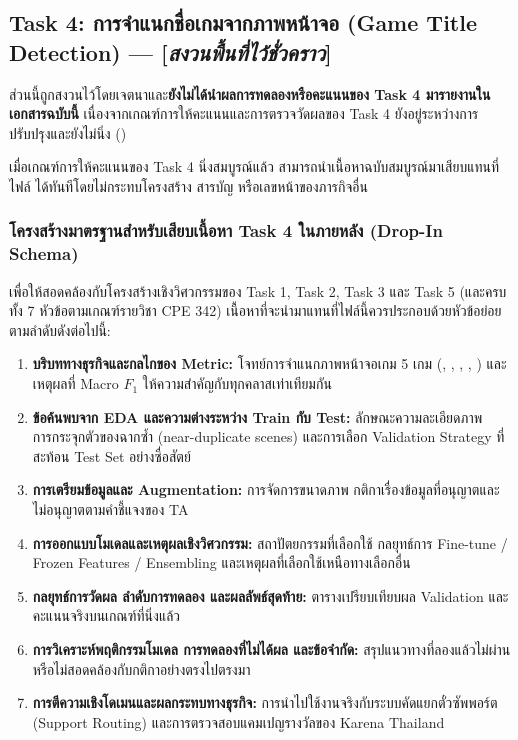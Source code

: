 \clearpage
\subsection{Task 4: การจำแนกชื่อเกมจากภาพหน้าจอ (Game Title Detection) — [\textit{สงวนพื้นที่ไว้ชั่วคราว}]}
\label{subsec:task4}

\begin{warningbox}
ส่วนนี้ถูกสงวนไว้โดยเจตนาและ\textbf{ยังไม่ได้นำผลการทดลองหรือคะแนนของ Task 4 มารายงานในเอกสารฉบับนี้} เนื่องจากเกณฑ์การให้คะแนนและการตรวจวัดผลของ Task 4 ยังอยู่ระหว่างการปรับปรุงและยังไม่นิ่ง (\TFourStatus)

เมื่อเกณฑ์การให้คะแนนของ Task 4 นิ่งสมบูรณ์แล้ว สามารถนำเนื้อหาฉบับสมบูรณ์มาเสียบแทนที่ไฟล์  ได้ทันทีโดยไม่กระทบโครงสร้าง สารบัญ หรือเลขหน้าของภารกิจอื่น
\end{warningbox}

\subsubsection*{โครงสร้างมาตรฐานสำหรับเสียบเนื้อหา Task 4 ในภายหลัง (Drop-In Schema)}
เพื่อให้สอดคล้องกับโครงสร้างเชิงวิศวกรรมของ Task 1, Task 2, Task 3 และ Task 5 (และครบทั้ง 7 หัวข้อตามเกณฑ์รายวิชา CPE 342) เนื้อหาที่จะนำมาแทนที่ไฟล์นี้ควรประกอบด้วยหัวข้อย่อยตามลำดับดังต่อไปนี้:
\begin{enumerate}
  \item \textbf{บริบททางธุรกิจและกลไกของ Metric:} โจทย์การจำแนกภาพหน้าจอเกม 5 เกม (, , , , ) และเหตุผลที่ Macro $F_1$ ให้ความสำคัญกับทุกคลาสเท่าเทียมกัน
  \item \textbf{ข้อค้นพบจาก EDA และความต่างระหว่าง Train กับ Test:} ลักษณะความละเอียดภาพ การกระจุกตัวของฉากซ้ำ (near-duplicate scenes) และการเลือก Validation Strategy ที่สะท้อน Test Set อย่างซื่อสัตย์
  \item \textbf{การเตรียมข้อมูลและ Augmentation:} การจัดการขนาดภาพ กติกาเรื่องข้อมูลที่อนุญาตและไม่อนุญาตตามคำชี้แจงของ TA
  \item \textbf{การออกแบบโมเดลและเหตุผลเชิงวิศวกรรม:} สถาปัตยกรรมที่เลือกใช้ กลยุทธ์การ Fine-tune / Frozen Features / Ensembling และเหตุผลที่เลือกใช้เหนือทางเลือกอื่น
  \item \textbf{กลยุทธ์การวัดผล ลำดับการทดลอง และผลลัพธ์สุดท้าย:} ตารางเปรียบเทียบผล Validation และคะแนนจริงบนเกณฑ์ที่นิ่งแล้ว
  \item \textbf{การวิเคราะห์พฤติกรรมโมเดล การทดลองที่ไม่ได้ผล และข้อจำกัด:} สรุปแนวทางที่ลองแล้วไม่ผ่านหรือไม่สอดคล้องกับกติกาอย่างตรงไปตรงมา
  \item \textbf{การตีความเชิงโดเมนและผลกระทบทางธุรกิจ:} การนำไปใช้งานจริงกับระบบคัดแยกตั๋วซัพพอร์ต (Support Routing) และการตรวจสอบแคมเปญรางวัลของ Karena Thailand
\end{enumerate}

